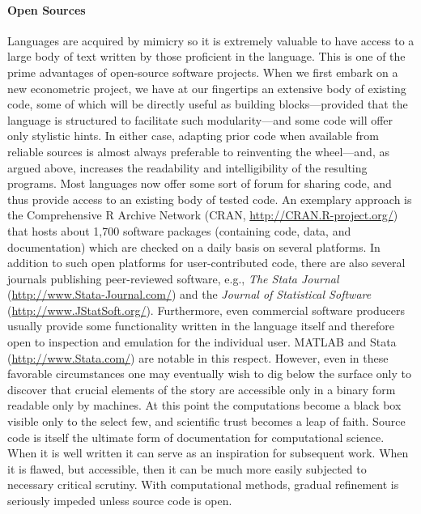 \documentclass[10pt,a4paper,twoside]{article}
\let\proglang=\textsf
\begin{document}
\paragraph{Open Sources}
Languages are acquired by mimicry so it is extremely valuable to have access to a
large body of text written by those proficient in the language.  This is one of
the prime advantages of open-source software projects. 
When we first embark on a new econometric project, we have at our fingertips an 
extensive body of existing code, some of which will be directly useful as building 
blocks---provided that the language is structured to facilitate such modularity---and
some code will offer only stylistic hints.  In either case, adapting prior code
when available from reliable sources is almost always preferable to reinventing
the wheel---and, as argued above, increases the readability and intelligibility 
of the resulting programs. Most languages now offer some sort of forum for sharing code,
and thus provide access to an existing body of tested code. An
exemplary approach is the Comprehensive \proglang{R} Archive Network
(CRAN, \url{http://CRAN.R-project.org/}) that hosts about 1,700 software
packages (containing code, data, and documentation) which are checked on 
a daily basis on several platforms.
In addition to such open platforms for user-contributed code,
there are also several journals publishing peer-reviewed software, e.g.,
\emph{The Stata Journal} (\url{http://www.Stata-Journal.com/}) and the
\emph{Journal of Statistical Software} (\url{http://www.JStatSoft.org/}).
Furthermore, even commercial software producers usually provide some functionality written in
the language itself and therefore open to inspection and emulation for the individual user.  
\proglang{MATLAB} and \proglang{Stata} (\url{http://www.Stata.com/})
are notable in this respect. However, even in these favorable circumstances 
one may eventually wish to dig below the surface only to discover that crucial
elements of the story are accessible only in a binary form readable only
by machines.  At this point the computations become a black box visible only
to the select few, and scientific trust becomes a leap of faith.
Source code is itself the ultimate form of documentation for computational
science. When it is well written it can serve as an inspiration for subsequent
work. When it is flawed, but accessible, then it can be much more easily 
subjected to necessary critical scrutiny.
With computational methods, gradual refinement is seriously impeded
unless source code is open.
\end{document}
